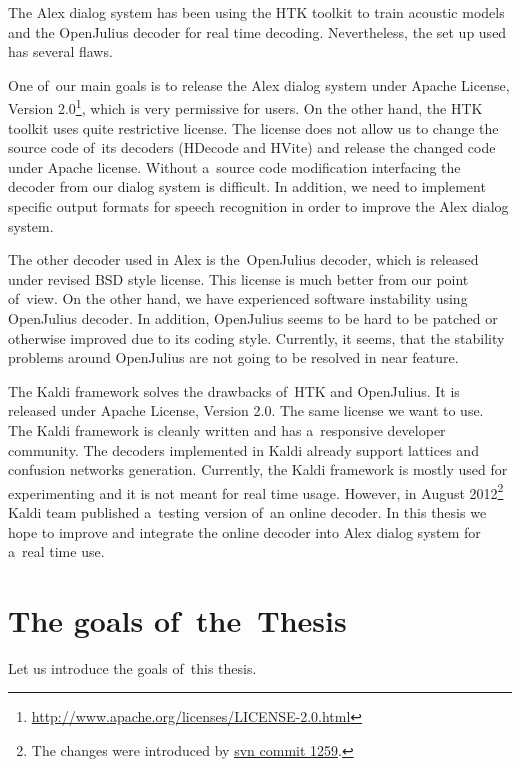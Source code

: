 The Alex dialog system has been using the HTK toolkit\cite{young94htk} to train acoustic models and the OpenJulius\cite{lee2009julius} decoder for real time decoding. Nevertheless, the set up used has several flaws.

One of~our main goals is to release the Alex dialog system under Apache License, Version 2.0\footnote{\url{http://www.apache.org/licenses/LICENSE-2.0.html}}, which is very permissive for users. On the other hand, the HTK toolkit uses quite restrictive license. The license does not allow us to change the source code of~its decoders (HDecode and HVite) and release the changed code under Apache license. Without a~source code modification interfacing the decoder from our dialog system is difficult. In addition, we need to implement specific output formats for speech recognition in order to improve the Alex dialog system.

The other decoder used in Alex is the~OpenJulius decoder, which is released under revised BSD style license. This license is much better from our point of~view. On the other hand, we have experienced software instability using OpenJulius decoder. In addition, OpenJulius seems to be hard to be patched or otherwise improved due to its coding style. Currently, it seems, that the stability problems around OpenJulius are not going to be resolved in near feature.

The Kaldi\cite{povey2011kaldi} framework solves the drawbacks of~HTK and OpenJulius. It is released under Apache License, Version 2.0. The same license we want to use. The Kaldi framework is cleanly written and has a~responsive developer community. The decoders implemented in Kaldi already support lattices and confusion networks generation. Currently, the Kaldi framework is mostly used for experimenting and it is not meant for real time usage. However, in August 2012\footnote{The changes were introduced by \href{https://sourceforge.net/p/kaldi/code/1259/}{svn commit 1259}.} Kaldi team published a~testing version of~an online decoder. In this thesis we hope to improve and integrate the online decoder into Alex dialog system for a~real time use.


\section{The goals of~the~Thesis} 
\label{sec:goals}
Let us introduce the goals of~this thesis.

